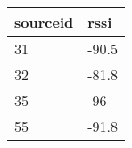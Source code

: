 \begin{tabular}{ll}
sourceid & rssi \\ 
\hline 
31 & -90.5 \\ 
32 & -81.8 \\ 
35 & -96 \\ 
55 & -91.8 \\ 
\hline 
\end{tabular}